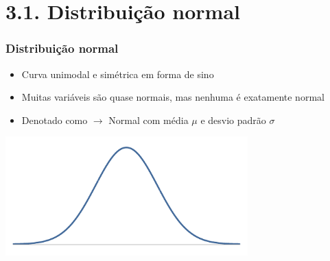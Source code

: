 
\section{3.1. Distribuição normal}


\begin{frame}
\frametitle{Distribuição normal}

\begin{itemize}
\justifying
\item Curva unimodal e simétrica em forma de sino
\justifying
\item Muitas variáveis são quase normais, mas nenhuma é exatamente normal
\justifying
\item Denotado como  $\rightarrow$ Normal com média $\mu$ e desvio padrão $\sigma$

\end{itemize}

\begin{center}
\includegraphics[width=0.7\textwidth]{3-1_normal_distribution/simpleNormal.pdf}
\end{center}

\end{frame}


